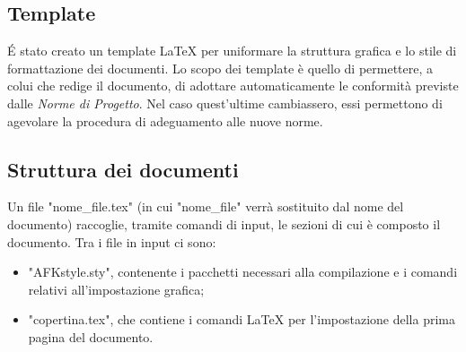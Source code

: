 \subsection{Template}
\'E stato creato un template \LaTeX{} per uniformare la struttura grafica e lo stile di formattazione dei documenti. Lo scopo dei template è quello di permettere, a colui che redige il documento, di adottare automaticamente le conformità previste dalle \textit{Norme di Progetto}. Nel caso quest'ultime cambiassero, essi permettono di agevolare la procedura di adeguamento alle nuove norme.

\subsection{Struttura dei documenti}
Un file "nome\_file.tex" (in cui "nome\_file" verrà sostituito dal nome del documento) raccoglie, tramite comandi di input, le sezioni di cui è composto il documento. Tra i file in input ci sono:
\begin{itemize}
\item "AFKstyle.sty", contenente i pacchetti necessari alla compilazione e i comandi relativi all'impostazione grafica;
\item "copertina.tex", che contiene i comandi \LaTeX{} per l'impostazione della prima pagina del documento.
\end{itemize}

